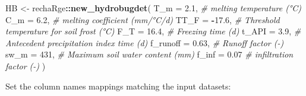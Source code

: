 \documentclass[
]{book}
\newenvironment{Shaded}{\begin{snugshade}}{\end{snugshade}}
\newcommand{\AttributeTok}[1]{\textcolor[rgb]{0.13,0.29,0.53}{#1}}
\newcommand{\CommentTok}[1]{\textcolor[rgb]{0.56,0.35,0.01}{\textit{#1}}}
\newcommand{\DecValTok}[1]{\textcolor[rgb]{0.00,0.00,0.81}{#1}}
\newcommand{\FloatTok}[1]{\textcolor[rgb]{0.00,0.00,0.81}{#1}}
\newcommand{\FunctionTok}[1]{\textcolor[rgb]{0.13,0.29,0.53}{\textbf{#1}}}
\newcommand{\NormalTok}[1]{#1}
\newcommand{\OtherTok}[1]{\textcolor[rgb]{0.56,0.35,0.01}{#1}}
\newcommand{\SpecialCharTok}[1]{\textcolor[rgb]{0.81,0.36,0.00}{\textbf{#1}}}
\newcommand{\StringTok}[1]{\textcolor[rgb]{0.31,0.60,0.02}{#1}}
\begin{document}
\begin{Shaded}
\begin{Highlighting}[]
\NormalTok{HB }\OtherTok{\textless{}{-}}\NormalTok{ rechaRge}\SpecialCharTok{::}\FunctionTok{new\_hydrobugdet}\NormalTok{(}
  \AttributeTok{T\_m =} \FloatTok{2.1}\NormalTok{, }\CommentTok{\# melting temperature (°C)}
  \AttributeTok{C\_m =} \FloatTok{6.2}\NormalTok{, }\CommentTok{\# melting coefficient (mm/°C/d)}
  \AttributeTok{TT\_F =} \SpecialCharTok{{-}}\FloatTok{17.6}\NormalTok{, }\CommentTok{\# Threshold temperature for soil frost (°C)}
  \AttributeTok{F\_T =} \FloatTok{16.4}\NormalTok{, }\CommentTok{\# Freezing time (d)}
  \AttributeTok{t\_API =} \FloatTok{3.9}\NormalTok{, }\CommentTok{\# Antecedent precipitation index time (d)}
  \AttributeTok{f\_runoff =} \FloatTok{0.63}\NormalTok{, }\CommentTok{\# Runoff factor ({-})}
  \AttributeTok{sw\_m =} \DecValTok{431}\NormalTok{, }\CommentTok{\# Maximum soil water content (mm)}
  \AttributeTok{f\_inf =} \FloatTok{0.07} \CommentTok{\# infiltration factor ({-})}
\NormalTok{)}
\end{Highlighting}
\end{Shaded}

Set the column names mappings matching the input datasets:

\begin{Shaded}
\end{Shaded}
\end{document}
